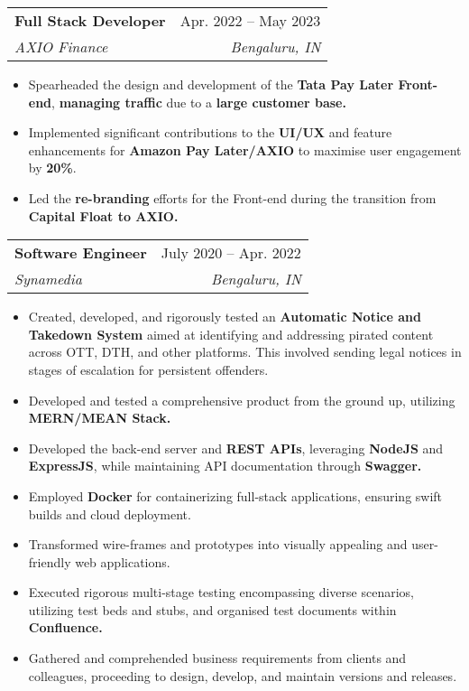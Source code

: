 \documentclass[letterpaper,11pt]{article}
\makeatletter
\newcommand{\resumeItem}[1]{
  \item\small{
    {#1 \vspace{-2pt}}
  }
}
\newcommand{\resumeSubheading}[4]{
  \vspace{-2pt}\item
    \begin{tabular*}{0.97\textwidth}[t]{l@{\extracolsep{\fill}}r}
      \textbf{#1} & #2 \\
      \textit{\small#3} & \textit{\small #4} \\
    \end{tabular*}\vspace{-7pt}
}
\newcommand{\resumeSubSubheading}[2]{
    \item
    \begin{tabular*}{0.97\textwidth}{l@{\extracolsep{\fill}}r}
      \textit{\small#1} & \textit{\small #2} \\
    \end{tabular*}\vspace{-7pt}
}
\newcommand{\resumeSubHeadingListEnd}{\end{itemize}}
\newcommand{\resumeItemListStart}{\begin{itemize}}
\newcommand{\resumeItemListEnd}{\end{itemize}\vspace{-5pt}}
\makeatother
\begin{document}

    \resumeSubheading
      {Full Stack Developer}{Apr. 2022 -- May 2023}
      {AXIO Finance}{Bengaluru, IN}
      \resumeItemListStart
        \resumeItem{Spearheaded the design and development of the \textbf{Tata Pay Later Front-end}, \textbf{managing traffic} due to a \textbf{large customer base.}}
        \resumeItem{Implemented significant contributions to the \textbf{UI/UX} and feature enhancements for \textbf{Amazon Pay Later/AXIO} to maximise user engagement by \textbf{20\%}.}
        \resumeItem{Led the \textbf{re-branding} efforts for the Front-end during the transition from \textbf{Capital Float to AXIO.}}
      \resumeItemListEnd

    \resumeSubheading
      {Software Engineer}{July 2020 -- Apr. 2022}
      {Synamedia}{Bengaluru, IN}
      \resumeItemListStart
        \resumeItem{Created, developed, and rigorously tested an \textbf{Automatic Notice and Takedown System} aimed at identifying and addressing pirated content across OTT, DTH, and other platforms. This involved sending legal notices in stages of escalation for persistent offenders.}
        \resumeItem{Developed and tested a comprehensive product from the ground up, utilizing \textbf{MERN/MEAN Stack.}}
        \resumeItem{Developed the back-end server and \textbf{REST APIs}, leveraging \textbf{NodeJS} and \textbf{ExpressJS}, while maintaining API documentation through \textbf{Swagger.}}
        \resumeItem{Employed \textbf{Docker} for containerizing full-stack applications, ensuring swift builds and cloud deployment.}
        \resumeItem{Transformed wire-frames and prototypes into visually appealing and user-friendly web applications.}
        \resumeItem{Executed rigorous multi-stage testing encompassing diverse scenarios, utilizing test beds and stubs, and organised test documents within \textbf{Confluence.}}
        \resumeItem{Gathered and comprehended business requirements from clients and colleagues, proceeding to design, develop, and maintain versions and releases.}
      \resumeItemListEnd
\end{document}
